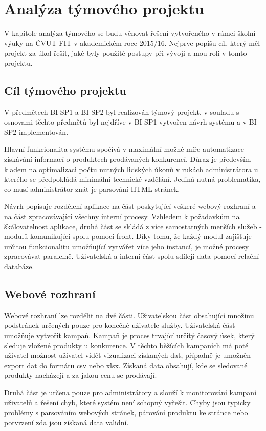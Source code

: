 \documentclass[thesis=B,czech]{FITthesis}[2012/06/26]
\begin{document}
\newpage

\chapter{Analýza týmového projektu}
V kapitole analýza týmového se budu věnovat řešení vytvořeného v rámci školní výuky na ČVUT FIT v akademickém roce 2015/16.
Nejprve popíšu cíl, který měl projekt za úkol řešit, jaké byly použité postupy při vývoji a mou roli v tomto projektu.

\section{Cíl týmového projektu}

V předmětech BI-SP1 a BI-SP2 byl realizován týmový projekt, v souladu s osnovami těchto předmětů byl nejdříve v BI-SP1 vytvořen návrh
systému a v BI-SP2 implementován.
\par
Hlavní funkcionalita systému spočívá v maximální možné míře automatizace získávání informací o produktech prodávaných konkurencí. Důraz je především kladem na optimalizaci počtu nutných lidských úkonů v rukách administrátora u kterého se předpokládá minimální technické vzdělání.
Jediná nutná problematika, co musí administrátor znát je parsování HTML stránek.
\par
Návrh popisuje rozdělení aplikace na část poskytující veškeré webový rozhraní a na část zpracovávající všechny interní procesy.
Vzhledem k požadavkům na škálovatelnost aplikace, druhá část se skládá z více samostatných menších služeb - modulů komunikující
spolu pomocí front. Díky tomu, že každý modul zajišťuje určitou funkcionalitu umožňující vytvářet více jeho instancí, je možné
procesy zpracovávat paralelně. 
Uživatelská a interní část spolu sdílejí data pomocí relační databáze\cite{DB}.
\par
\section{Webové rozhraní}
Webové rozhraní lze rozdělit na dvě části. Uživatelskou část obsahující množinu podstránek určených pouze pro konečné uživatele
služby. Uživatelská část umožňuje vytvořit kampaň. Kampaň je proces trvající určitý časový úsek, který sleduje vložené produkty u konkurence.
V těchto běžících kampaních má poté uživatel možnost uživatel vidět vizualizaci získaných dat, případně je umožněn export dat do formátu
csv nebo xlsx. Získaná data obsahují, kde se sledované produkty nacházejí a za jakou cenu se prodávají.
\par
Druhá část je určena pouze pro administrátory a slouží k monitorování kampaní uživatelů a řešení chyb, které systém není schopný vyřešit.
Chyby jsou typicky problémy s parsováním webových stránek, párování produktu ke stránce nebo potvrzení zda jsou získaná data validní.
\end{document}
